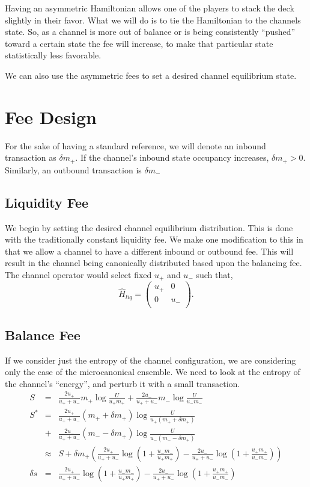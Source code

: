 \documentclass[review,12pt]{elsarticle}
\begin{document}
Having an asymmetric Hamiltonian allows one of the players to stack the deck slightly in their favor.
What we will do is to tie the Hamiltonian to the channels state.
So, as a channel is more out of balance or is being consistently ``pushed'' toward a certain state the fee will increase, to make that particular state statistically less favorable.

We can also use the asymmetric fees to set a desired channel equilibrium state.

\section{Fee Design}
For the sake of having a standard reference, we will denote an inbound transaction as $\delta m_+$.
If the channel's inbound state occupancy increases, $\delta m_+ > 0$.
Similarly, an outbound transaction is $\delta m_-$

\subsection{Liquidity Fee}
We begin by setting the desired channel equilibrium distribution.
This is done with the traditionally constant liquidity fee.
We make one modification to this in that we allow a channel to have a different inbound or outbound fee.
This will result in the channel being canonically distributed based upon the balancing fee.
The channel operator would select fixed $u_+$ and $u_-$ such that,
\begin{equation}
  \hat{H}_{liq} = \begin{pmatrix}
    u_+ & 0   \\
    0   & u_- \\
  \end{pmatrix}. \nonumber
\end{equation}

\subsection{Balance Fee}
If we consider just the entropy of the channel configuration, we are considering only the case of the microcanonical ensemble.
We need to look at the entropy of the channel's ``energy'', and perturb it with a small transaction.
\begin{eqnarray}
  S & = & \frac{2u_+}{u_+ + u_-} m_+ \log \frac{U}{u_+ m_+} + \frac{2u_-}{u_+ + u_-} m_- \log \frac{U}{u_- m_-} \nonumber \\
  S^* & = & \frac{2u_+}{u_+ + u_-} (m_+ + \delta m_+) \log \frac{U}{u_+ (m_+ + \delta m_+)} \nonumber\\
  & + & \frac{2u_-}{u_+ + u_-} (m_- - \delta m_+) \log \frac{U}{u_- (m_- - \delta m_+)}  \nonumber \\
  & \approx & S + \delta m_+ \left( \frac{2u_+}{u_+ + u_-}\log \left(1 + \frac{u_- m_-}{u_+ m_+}\right) - \frac{2u_-}{u_+ + u_-} \log \left(1 + \frac{u_+ m_+}{u_- m_-}\right) \right) \nonumber \\
  \delta s & = & \frac{2u_+}{u_+ + u_-}\log \left(1 + \frac{u_- m_-}{u_+ m_+}\right) - \frac{2u_-}{u_+ + u_-} \log \left(1 + \frac{u_+ m_+}{u_- m_-}\right) \nonumber
\end{eqnarray}
\end{document}
